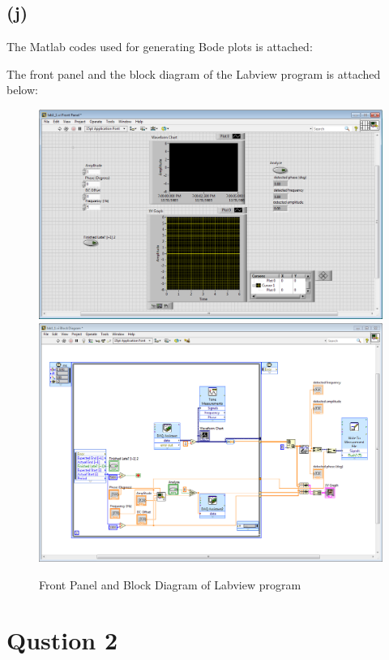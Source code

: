 \documentclass[letterpaper]{article}
\begin{document}
\subsection*{(j)}
The Matlab codes used for generating Bode plots is attached:

The front panel and the block diagram of the Labview program is attached below:
\begin{figure}[H]
	\centering
	\includegraphics[scale=0.3]{front_panel.PNG}\includegraphics[scale=0.25]{block_diagram.PNG}
	\caption{Front Panel and Block Diagram of Labview program}
	\label{Fp_Bd}
\end{figure}
\section*{Qustion 2}
\end{document}
